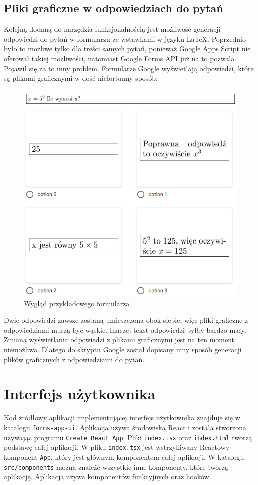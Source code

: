 \subsection{Pliki graficzne w odpowiedziach do pytań}
Kolejną dodaną do narzędzia funkcjonalnością jest możliwość generacji odpowiedzi do pytań
w formularzu ze wstawkami w języku \LaTeX. Poprzednio było to możliwe tylko dla treści samych
pytań, ponieważ Google Apps Script nie oferował takiej możliwości, natomiast Google Forms API 
już na to pozwala. Pojawił się za to inny problem. Formularze Google wyświetlają odpowiedzi,
które są plikami graficznymi
w dość niefortunny sposób:
\begin{figure}[H]
  \centering
   \includegraphics[scale=0.50]{odpowiedzi.png}
   \caption{Wygląd przykładowego formularza}
   \label{fig:1}
 \end{figure}
Dwie odpowiedzi zawsze zostaną umieszczona obok siebie, więc pliki graficzne z odpowiedziami
muszą być wąskie. Inaczej tekst odpowiedzi byłby bardzo mały. Zmiana wyświetlania odpowiedzi
z plikami graficznymi jest na ten moment niemożliwa. Dlatego do skryptu Google został dopisany inny sposób generacji plików graficznych z odpowiedziami do pytań.

\section{Interfejs użytkownika}
Kod źródłowy aplikacji implementującej interfejs użytkownika znajduje się w katalogu
\texttt{forms-app-ui}. Aplikacja używa środowiska React i została stworzona używając programu
\texttt{Create React App}. Pliki \texttt{index.tsx} oraz \texttt{index.html}
tworzą podstawę całej aplikacji. W pliku \texttt{index.tsx} jest wstrzykiwany Reactowy
komponent \texttt{App}, który jest głównym komponentem całej aplikacji. W katalogu 
\texttt{src/components} można znaleźć wszystkie inne komponenty, które tworzą aplikację.
Aplikacja używa komponentów funkcyjnych oraz hooków. 
 